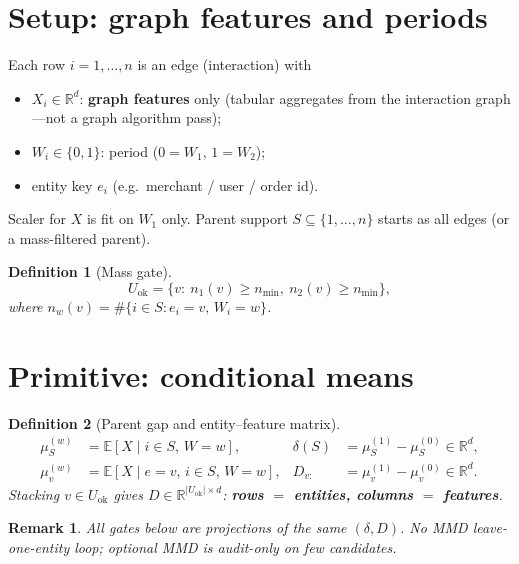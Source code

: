 \documentclass[11pt]{article}
\newtheorem{definition}{Definition}
\newtheorem{remark}{Remark}
\newcommand{\E}{\mathbb{E}}
\newcommand{\R}{\mathbb{R}}
\begin{document}
\section{Setup: graph features and periods}
\label{sec:setup}

Each row $i=1,\ldots,n$ is an edge (interaction) with
\begin{itemize}[leftmargin=1.4em]
  \item $X_i\in\R^d$: \textbf{graph features} only
    (tabular aggregates from the interaction graph---not a graph
    algorithm pass);
  \item $W_i\in\{0,1\}$: period ($0=W_1$, $1=W_2$);
  \item entity key $e_i$ (e.g.\ merchant / user / order id).
\end{itemize}
Scaler for $X$ is fit on $W_1$ only. Parent support $S\subseteq\{1,\ldots,n\}$
starts as all edges (or a mass-filtered parent).

\begin{definition}[Mass gate]
\[
  U_{\mathrm{ok}}
  =\bigl\{
    v:\ n_1(v)\ge n_{\min},\ n_2(v)\ge n_{\min}
  \bigr\},
\]
where $n_w(v)=\#\{i\in S: e_i=v,\,W_i=w\}$.
\end{definition}

\section{Primitive: conditional means}
\label{sec:cmean}

\begin{definition}[Parent gap and entity--feature matrix]
\begin{align}
  \mu_S^{(w)}
  &=\E[X\mid i\in S,\,W=w],
  &
  \delta(S)
  &=\mu_S^{(1)}-\mu_S^{(0)}\in\R^d,
  \label{eq:delta}\\
  \mu_v^{(w)}
  &=\E[X\mid e=v,\,i\in S,\,W=w],
  &
  D_{v:}
  &=\mu_v^{(1)}-\mu_v^{(0)}\in\R^d.
  \label{eq:D}
\end{align}
Stacking $v\in U_{\mathrm{ok}}$ gives $D\in\R^{|U_{\mathrm{ok}}|\times d}$:
\textbf{rows $=$ entities, columns $=$ features}.
\end{definition}

\begin{remark}
All gates below are projections of the same $(\delta,D)$. No MMD
leave-one-entity loop; optional MMD is audit-only on few candidates.
\end{remark}
\end{document}
